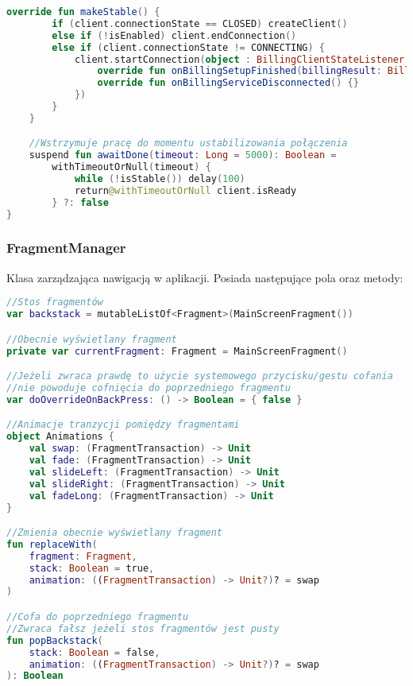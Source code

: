 \begin{lstlisting}[language=Kotlin]
    override fun makeStable() {
        if (client.connectionState == CLOSED) createClient()
        else if (!isEnabled) client.endConnection()
        else if (client.connectionState != CONNECTING) {
            client.startConnection(object : BillingClientStateListener {
                override fun onBillingSetupFinished(billingResult: BillingResult) {}
                override fun onBillingServiceDisconnected() {}
            })
        }
    }

    //Wstrzymuje pracę do momentu ustabilizowania połączenia
    suspend fun awaitDone(timeout: Long = 5000): Boolean = 
        withTimeoutOrNull(timeout) {
            while (!isStable()) delay(100)
            return@withTimeoutOrNull client.isReady
        } ?: false
}
\end{lstlisting}

\newpage

\subsubsection{FragmentManager}
Klasa zarządzająca nawigacją w aplikacji. Posiada następujące pola oraz metody:

\begin{lstlisting}[language=Kotlin]
//Stos fragmentów
var backstack = mutableListOf<Fragment>(MainScreenFragment())

//Obecnie wyświetlany fragment
private var currentFragment: Fragment = MainScreenFragment()

//Jeżeli zwraca prawdę to użycie systemowego przycisku/gestu cofania
//nie powoduje cofnięcia do poprzedniego fragmentu
var doOverrideOnBackPress: () -> Boolean = { false }

//Animacje tranzycji pomiędzy fragmentami
object Animations {
    val swap: (FragmentTransaction) -> Unit
    val fade: (FragmentTransaction) -> Unit
    val slideLeft: (FragmentTransaction) -> Unit
    val slideRight: (FragmentTransaction) -> Unit
    val fadeLong: (FragmentTransaction) -> Unit
}

//Zmienia obecnie wyświetlany fragment
fun replaceWith(
    fragment: Fragment,
    stack: Boolean = true,
    animation: ((FragmentTransaction) -> Unit?)? = swap
)

//Cofa do poprzedniego fragmentu
//Zwraca fałsz jeżeli stos fragmentów jest pusty
fun popBackstack(
    stack: Boolean = false,
    animation: ((FragmentTransaction) -> Unit?)? = swap
): Boolean
\end{lstlisting}

